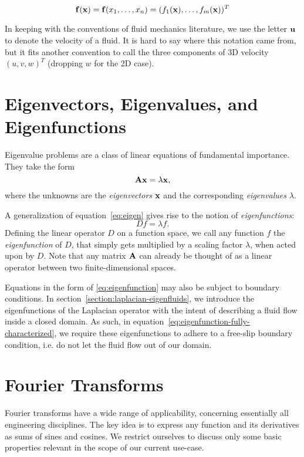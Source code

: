 $$\vb{f}(\vb{x}) = \vb{f}(x_1,\dots, x_n) =
(f_1(\vb{x}), \dots, f_m(\vb{x}))^T$$

In keeping with the conventions of fluid mechanics literature, we use the letter
$\vb{u}$ to denote the velocity of a fluid. It is hard to say where this
notation came from, but it fits another convention to call the three components
of 3D velocity $(u, v, w)^T$ (dropping $w$ for the 2D case).

\section{Eigenvectors, Eigenvalues, and Eigenfunctions}
Eigenvalue problems are a class of linear equations of fundamental importance.
They take the form
\begin{equation}\label{eq:eigen}
    \vb{A}\vb{x} = \lambda\vb{x},
\end{equation}
where the unknowns are the \textit{eigenvectors} $\vb{x}$ and the corresponding
\textit{eigenvalues} $\lambda$.

A generalization of equation~\ref{eq:eigen} gives rise to the notion of
\textit{eigenfunctions}:
\begin{equation}\label{eq:eigenfunction}
    D f = \lambda f.
\end{equation}
Defining the linear operator $D$ on a function space, we call any 
function $f$ the \textit{eigenfunction} of $D$, that simply gets multiplied by a
scaling factor $\lambda$, when acted upon by $D$. Note that any matrix
$\vb{A}$ can already be thought of as a linear operator between two
finite-dimensional spaces.

Equations in the form of \ref{eq:eigenfunction} may also be subject to
boundary conditions. In section~\ref{section:laplacian-eigenfluids}, we
introduce the eigenfunctions of the Laplacian operator with the intent of
describing a fluid flow inside a closed domain. As such, in
equation~\ref{eq:eigenfunction-fully-characterized}, we require these
eigenfunctions to adhere to a free-slip boundary condition, i.e. do not let the
fluid flow out of our domain.

\section{Fourier Transforms}
Fourier transforms have a wide range of applicability, concerning essentially
all engineering disciplines. The key idea is to express any function and its
derivatives as sums of sines and cosines. We restrict ourselves to discuss only
some basic properties relevant in the scope of our current use-case. 


